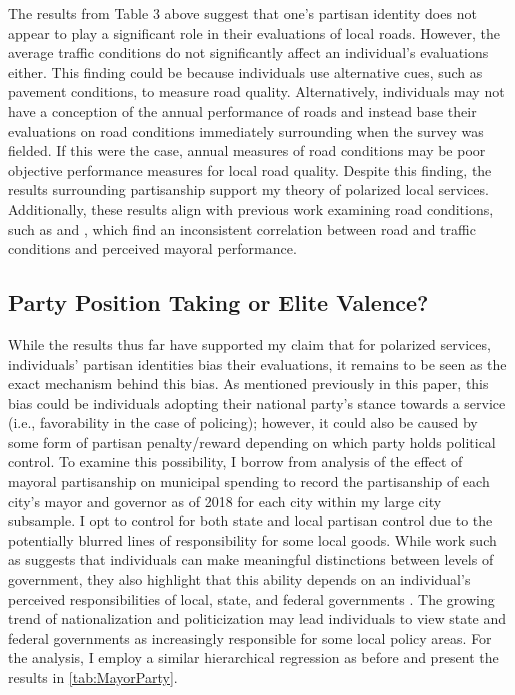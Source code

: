 The results from Table 3 above suggest that one's partisan identity does not appear to play a significant role in their evaluations of local roads. However, the average traffic conditions do not significantly affect an individual's evaluations either. This finding could be because individuals use alternative cues, such as pavement conditions, to measure road quality. Alternatively, individuals may not have a conception of the annual performance of roads and instead base their evaluations on road conditions immediately surrounding when the survey was fielded. If this were the case, annual measures of road conditions may be poor objective performance measures for local road quality. Despite this finding, the results surrounding partisanship support my theory of polarized local services. Additionally, these results align with previous work examining road conditions, such as \citet{arceneauxDoesFederalismWeaken2005} and \citet{debenedictis-kessnerHowAttributionInhibits2018}, which find an inconsistent correlation between road and traffic conditions and perceived mayoral performance.

\subsection{Party Position Taking or Elite Valence?}
While the results thus far have supported my claim that for polarized services, individuals' partisan identities bias their evaluations, it remains to be seen as the exact mechanism behind this bias. As mentioned previously in this paper, this bias could be individuals adopting their national party's stance towards a service (i.e., favorability in the case of policing); however, it could also be caused by some form of partisan penalty/reward depending on which party holds political control. To examine this possibility, I borrow from \citet{debenedictis-kessnerAccountabilityLocalEconomy2020} analysis of the effect of mayoral partisanship on municipal spending to record the partisanship of each city's mayor and governor as of 2018 for each city within my large city subsample. I opt to control for both state and local partisan control due to the potentially blurred lines of responsibility for some local goods. While work such as \citet{arceneauxFederalFaceVoting2006} suggests that individuals can make meaningful distinctions between levels of government, they also highlight that this ability depends on an individual's perceived responsibilities of local, state, and federal governments \citep{arceneauxDoesFederalismWeaken2005}. The growing trend of nationalization and politicization may lead individuals to view state and federal governments as increasingly responsible for some local policy areas. For the analysis,  I employ a similar hierarchical regression as before and present the results in \autoref{tab:MayorParty}. 


